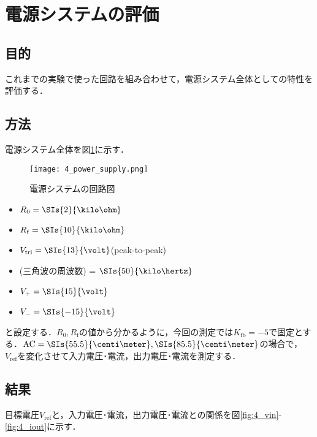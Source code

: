 \documentclass[1_power_supply.tex]{subfiles}
\begin{document}
\section{電源システムの評価}

  \subsection{目的}

    これまでの実験で使った回路を組み合わせて，電源システム全体としての特性を評価する．

  \subsection{方法}

    電源システム全体を図\ref{fig:4_power_supply}に示す．


    \begin{figure}[htbp]
      \begin{center}
        \texttt{[image: 4\_power\_supply.png]}
        \caption{電源システムの回路図}\label{fig:4_power_supply}
      \end{center}
    \end{figure}

    \begin{itemize}
      \item $R_0 = \SIs{2}{\kilo\ohm}$
      \item $R_\mathrm{f} = \SIs{10}{\kilo\ohm}$
      \item $V_\mathrm{tri} = \SIs{13}{\volt}$(peak-to-peak)
      \item (三角波の周波数) = $\SIs{50}{\kilo\hertz}$
      \item $V_+ = \SIs{15}{\volt}$
      \item $V_- = \SIs{-15}{\volt}$
    \end{itemize}
    と設定する．$R_0,R_\mathrm{f}$の値から分かるように，今回の測定では$K_\mathrm{fb}=-5$で固定とする．$\mathrm{AC}=\SIs{55.5}{\centi\meter},\SIs{85.5}{\centi\meter}$の場合で，$V_\mathrm{ref}$を変化させて入力電圧･電流，出力電圧･電流を測定する．

  \subsection{結果}

    目標電圧$V_\mathrm{ref}$と，入力電圧･電流，出力電圧･電流との関係を図\ref{fig:4_vin}-\ref{fig:4_iout}に示す．
\end{document}

